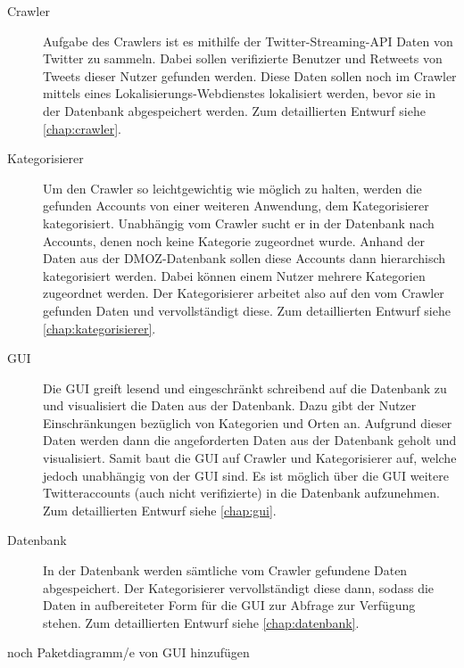 \begin{description}
	\item[Crawler] Aufgabe des Crawlers ist es mithilfe der Twitter-Streaming-API Daten von Twitter zu sammeln. Dabei sollen verifizierte Benutzer und Retweets von Tweets dieser Nutzer gefunden werden. Diese Daten sollen noch im Crawler mittels eines Lokalisierungs-Webdienstes lokalisiert werden, bevor sie in der Datenbank abgespeichert werden. Zum detaillierten Entwurf siehe \cref{chap:crawler}.
	\item[Kategorisierer] Um den Crawler so leichtgewichtig wie möglich zu halten, werden die gefunden Accounts von einer weiteren Anwendung, dem Kategorisierer kategorisiert. Unabhängig vom Crawler sucht er in der Datenbank nach Accounts, denen noch keine Kategorie zugeordnet wurde. Anhand der Daten aus der DMOZ-Datenbank sollen diese Accounts dann hierarchisch kategorisiert werden. Dabei können einem Nutzer mehrere Kategorien zugeordnet werden. Der Kategorisierer arbeitet also auf den vom Crawler gefunden Daten und vervollständigt diese. Zum detaillierten Entwurf siehe \cref{chap:kategorisierer}.
	\item[GUI] Die GUI greift lesend und eingeschränkt schreibend auf die Datenbank zu und visualisiert die Daten aus der Datenbank. Dazu gibt der Nutzer Einschränkungen bezüglich von Kategorien und Orten an. Aufgrund dieser Daten werden dann die angeforderten Daten aus der Datenbank geholt und visualisiert. Samit baut die GUI auf Crawler und Kategorisierer auf, welche jedoch unabhängig von der GUI sind. Es ist möglich über die GUI weitere Twitteraccounts (auch nicht verifizierte) in die Datenbank aufzunehmen. Zum detaillierten Entwurf siehe \cref{chap:gui}.
	\item[Datenbank] In der Datenbank werden sämtliche vom Crawler gefundene Daten abgespeichert. Der Kategorisierer vervollständigt diese dann, sodass die Daten in aufbereiteter Form für die GUI zur Abfrage zur Verfügung stehen. Zum detaillierten Entwurf siehe \cref{chap:datenbank}.
\end{description}

noch Paketdiagramm/e von GUI hinzufügen